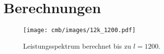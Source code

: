 \section{Berechnungen}

\begin{figure}
	\centering
	\texttt{[image: cmb/images/12k\_1200.pdf]}
	\caption{Leistungsspektrum berechnet bis zu $l = 1200$.}
	\label{fig:cmb-power-spec-1200}
\end{figure}